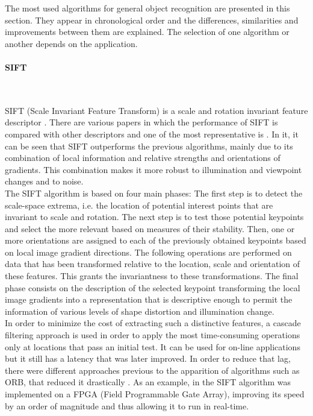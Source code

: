 The most used algorithms for general object recognition are presented in this section. 
They appear in chronological order and the differences, similarities and improvements between them are explained. 
The selection of one algorithm or another depends on the application.


\paragraph{SIFT}\mbox{}\\
\label{sift}

SIFT (Scale Invariant Feature Transform) is a scale and rotation invariant feature descriptor \cite{sift}. 
There are various papers in which the performance of SIFT is compared with other descriptors and one of the most representative is \cite{Mikolajczyk2005}. In it, it can be seen that SIFT 
outperforms the previous algorithms, mainly due to its combination of local information and relative strengths and orientations of gradients. This combination makes it more robust to illumination and viewpoint changes and to noise. 
\\

The SIFT algorithm is based on four main phases: 
The first step is to detect the scale-space extrema, i.e. the location of potential interest points that are invariant to scale and rotation. 
The next step is to test those potential keypoints and select the more relevant based on measures of their stability. 
Then, one or more orientations are assigned to each of the previously obtained keypoints based on local image gradient directions. 
The following operations are performed on data that has been transformed relative to the location, scale and orientation of these features. 
This grants the invariantness to these transformations. 
The final phase consists on the description of the selected keypoint transforming the local image gradients into a representation that is descriptive enough to permit the information of various levels of shape distortion and illumination change. 
\\

In order to minimize the cost of extracting such a distinctive features, a cascade filtering approach is used in order to apply the most time-consuming operations only at locations that pass an initial test. 
It can be used for on-line applications but it still has a latency that was later improved. 
In order to reduce that lag, there were different approaches previous to the apparition of algorithms such as ORB, that reduced it drastically \cite{orb}. 
As an example, in \cite{sift_fpga} the SIFT algorithm was implemented on a FPGA (Field Programmable Gate Array), improving its speed by an order of magnitude and thus allowing it to run in real-time.
\\

